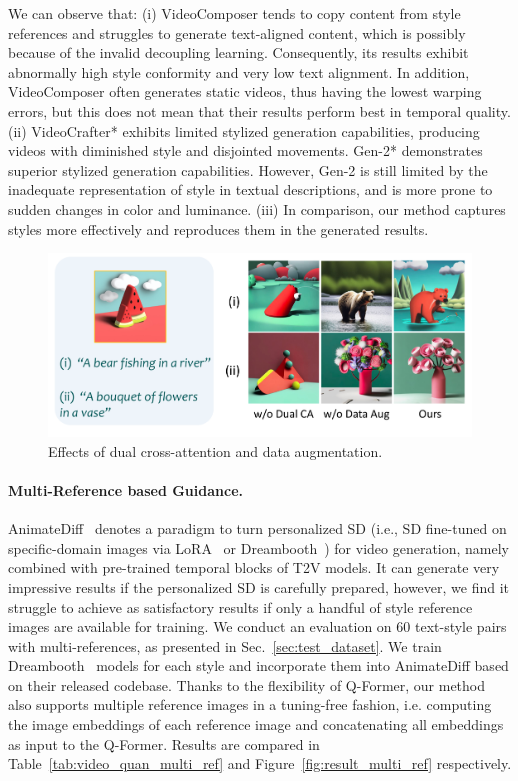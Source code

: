 We can observe that: 
(i) VideoComposer tends to copy content from style references and struggles to generate text-aligned content, which is possibly because of the invalid decoupling learning. Consequently, its results exhibit abnormally high style conformity and very low text alignment. In addition, VideoComposer often generates static videos, thus having the lowest warping errors, but this does not mean that their results perform best in temporal quality. 
(ii) VideoCrafter* exhibits limited stylized generation capabilities, producing videos with diminished style and disjointed movements. Gen-2* demonstrates superior stylized generation capabilities. However, Gen-2 is still limited by the inadequate representation of style in textual descriptions, and is more prone to sudden changes in color and luminance. (iii) In comparison, our method captures styles more effectively and reproduces them in the generated results.

\begin{figure}[!t]
    \centering
    \includegraphics[width=\linewidth]{figures/ablation_img_1.pdf}
    \vspace{-3em}
    \caption{Effects of dual cross-attention and data augmentation.} 
    \label{fig:ablation_img_1_2}
    \vspace{-1em}
\end{figure}


\vspace{-0.5em}
\paragraph{Multi-Reference based Guidance.}
AnimateDiff~\cite{guo2023animatediff} denotes a paradigm to turn personalized SD (i.e., SD fine-tuned on specific-domain images via LoRA~\cite{hu2022lora} or Dreambooth~\cite{dreambooth}) for video generation, namely combined with pre-trained temporal blocks of T2V models. It can generate very impressive results if the personalized SD is carefully prepared, however, we find it struggle to achieve as satisfactory results if only a handful of style reference images are available for training.
We conduct an evaluation on 60 text-style pairs with multi-references, as presented in Sec.~\ref{sec:test_dataset}. We train Dreambooth~\cite{dreambooth} models for each style and incorporate them into AnimateDiff based on their released codebase. Thanks to the flexibility of Q-Former, our method also supports multiple reference images in a tuning-free fashion, i.e. computing the image embeddings of each reference image and concatenating all embeddings as input to the Q-Former.
Results are compared in Table~\ref{tab:video_quan_multi_ref} and Figure~\ref{fig:result_multi_ref} respectively.


